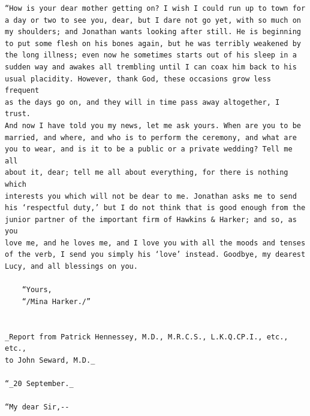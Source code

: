 \documentclass{article}
\begin{document}
\begin{verbatim}
“How is your dear mother getting on? I wish I could run up to town for
a day or two to see you, dear, but I dare not go yet, with so much on
my shoulders; and Jonathan wants looking after still. He is beginning
to put some flesh on his bones again, but he was terribly weakened by
the long illness; even now he sometimes starts out of his sleep in a
sudden way and awakes all trembling until I can coax him back to his
usual placidity. However, thank God, these occasions grow less frequent
as the days go on, and they will in time pass away altogether, I trust.
And now I have told you my news, let me ask yours. When are you to be
married, and where, and who is to perform the ceremony, and what are
you to wear, and is it to be a public or a private wedding? Tell me all
about it, dear; tell me all about everything, for there is nothing which
interests you which will not be dear to me. Jonathan asks me to send
his ‘respectful duty,’ but I do not think that is good enough from the
junior partner of the important firm of Hawkins & Harker; and so, as you
love me, and he loves me, and I love you with all the moods and tenses
of the verb, I send you simply his ‘love’ instead. Goodbye, my dearest
Lucy, and all blessings on you.

    “Yours,
    “/Mina Harker./”


_Report from Patrick Hennessey, M.D., M.R.C.S., L.K.Q.CP.I., etc., etc.,
to John Seward, M.D._

“_20 September._

“My dear Sir,--


\end{verbatim}
\end{document}
